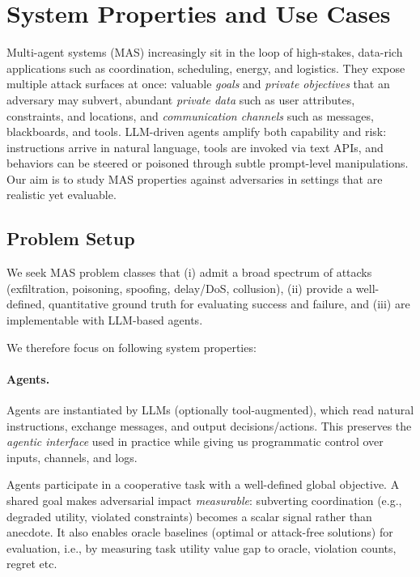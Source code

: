 
\section{System Properties and Use Cases}
Multi-agent systems (MAS) increasingly sit in the loop of high-stakes, data-rich applications such as coordination, scheduling, energy, and logistics. They expose multiple attack surfaces at once: valuable \emph{goals} and \emph{private objectives} that an adversary may subvert, abundant \emph{private data} such as user attributes, constraints, and locations, and \emph{communication channels} such as messages, blackboards, and tools. LLM-driven agents amplify both capability and risk: instructions arrive in natural language, tools are invoked via text APIs, and behaviors can be steered or poisoned through subtle prompt-level manipulations. Our aim is to study MAS properties against adversaries in settings that are realistic yet evaluable.


\subsection{Problem Setup}
\label{sec:prob_setup}

We seek MAS problem classes that (i) admit a broad spectrum of attacks (exfiltration, poisoning, spoofing, delay/DoS, collusion), (ii) provide a well-defined, quantitative ground truth for evaluating success and failure, and (iii) are implementable with LLM-based agents.

\medskip
We therefore focus on following system properties:

\paragraph{Agents.} Agents are instantiated by LLMs (optionally tool-augmented), which read natural instructions, exchange messages, and output decisions/actions. This preserves the \emph{agentic interface} used in practice while giving us programmatic control over inputs, channels, and logs.


Agents participate in a cooperative task with a well-defined global objective. A shared goal makes adversarial impact \emph{measurable}: subverting coordination (e.g., degraded utility, violated constraints) becomes a scalar signal rather than anecdote. It also enables oracle baselines (optimal or attack-free solutions) for evaluation, i.e., by measuring task utility value gap to oracle, violation counts, regret etc.


